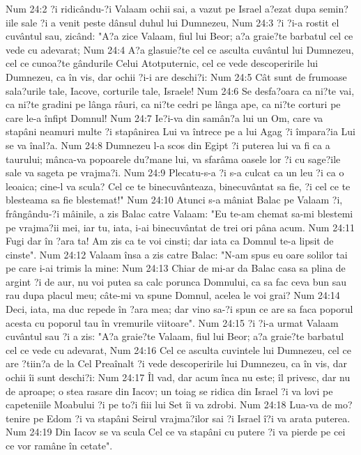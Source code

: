 Num 24:2  ?i ridicându-?i Valaam ochii sai, a vazut pe Israel a?ezat dupa semin?iile sale ?i a venit peste dânsul duhul lui Dumnezeu,
Num 24:3  ?i ?i-a rostit el cuvântul sau, zicând: "A?a zice Valaam, fiul lui Beor; a?a graie?te barbatul cel ce vede cu adevarat;
Num 24:4  A?a glasuie?te cel ce asculta cuvântul lui Dumnezeu, cel ce cunoa?te gândurile Celui Atotputernic, cel ce vede descoperirile lui Dumnezeu, ca în vis, dar ochii ?i-i are deschi?i:
Num 24:5  Cât sunt de frumoase sala?urile tale, Iacove, corturile tale, Israele!
Num 24:6  Se desfa?oara ca ni?te vai, ca ni?te gradini pe lânga râuri, ca ni?te cedri pe lânga ape, ca ni?te corturi pe care le-a înfipt Domnul!
Num 24:7  Ie?i-va din samân?a lui un Om, care va stapâni neamuri multe ?i stapânirea Lui va întrece pe a lui Agag ?i împara?ia Lui se va înal?a.
Num 24:8  Dumnezeu l-a scos din Egipt ?i puterea lui va fi ca a taurului; mânca-va popoarele du?mane lui, va sfarâma oasele lor ?i cu sage?ile sale va sageta pe vrajma?i.
Num 24:9  Plecatu-s-a ?i s-a culcat ca un leu ?i ca o leoaica; cine-l va scula? Cel ce te binecuvânteaza, binecuvântat sa fie, ?i cel ce te blesteama sa fie blestemat!"
Num 24:10  Atunci s-a mâniat Balac pe Valaam ?i, frângându-?i mâinile, a zis Balac catre Valaam: "Eu te-am chemat sa-mi blestemi pe vrajma?ii mei, iar tu, iata, i-ai binecuvântat de trei ori pâna acum.
Num 24:11  Fugi dar în ?ara ta! Am zis ca te voi cinsti; dar iata ca Domnul te-a lipsit de cinste".
Num 24:12  Valaam însa a zis catre Balac: "N-am spus eu oare solilor tai pe care i-ai trimis la mine:
Num 24:13  Chiar de mi-ar da Balac casa sa plina de argint ?i de aur, nu voi putea sa calc porunca Domnului, ca sa fac ceva bun sau rau dupa placul meu; câte-mi va spune Domnul, acelea le voi grai?
Num 24:14  Deci, iata, ma duc repede în ?ara mea; dar vino sa-?i spun ce are sa faca poporul acesta cu poporul tau în vremurile viitoare".
Num 24:15  ?i ?i-a urmat Valaam cuvântul sau ?i a zis: "A?a graie?te Valaam, fiul lui Beor; a?a graie?te barbatul cel ce vede cu adevarat,
Num 24:16  Cel ce asculta cuvintele lui Dumnezeu, cel ce are ?tiin?a de la Cel Preaînalt ?i vede descoperirile lui Dumnezeu, ca în vis, dar ochii îi sunt deschi?i:
Num 24:17  Îl vad, dar acum înca nu este; îl privesc, dar nu de aproape; o stea rasare din Iacov; un toiag se ridica din Israel ?i va lovi pe capeteniile Moabului ?i pe to?i fiii lui Set îi va zdrobi.
Num 24:18  Lua-va de mo?tenire pe Edom ?i va stapâni Seirul vrajma?ilor sai ?i Israel î?i va arata puterea.
Num 24:19  Din Iacov se va scula Cel ce va stapâni cu putere ?i va pierde pe cei ce vor ramâne în cetate".

